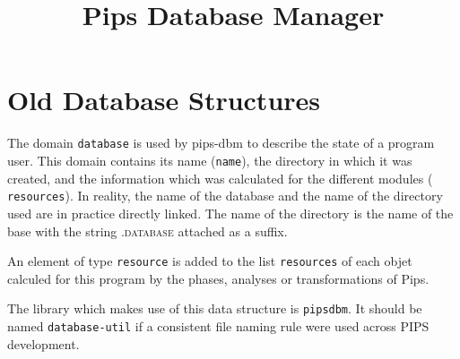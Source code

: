 \documentclass[a4paper]{article}
\title{Pips Database Manager}
\begin{document}
\maketitle
 
\section{Old Database Structures}
 
{ The domain {\tt database} is used by pips-dbm
  to describe the state of a program user. This domain contains its
  name ({\tt name}), the directory in which it was created, and the
  information which was calculated for the different modules ({\tt
    resources}). In reality, the name of the database and the name of the
  directory used are in practice directly linked. The name of the
  directory is the name of the base with the string \textsc{.database}
  attached as a suffix.
 
An element of type {\tt resource} is added to the list {\tt resources}
of each objet calculed for this program by the phases, analyses or
transformations of Pips.
 
The library which makes use of this data structure is
\texttt{pipsdbm}. It should be named \texttt{database-util} if a
consistent file naming rule were used across PIPS development.
 
}
 
\end{document}
